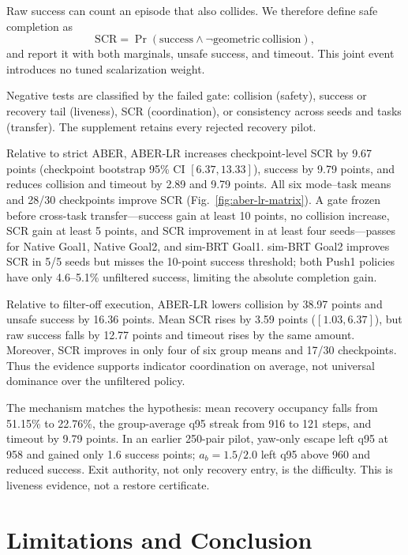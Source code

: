 \documentclass[letterpaper]{article}
\begin{document}
Raw success can count an episode that also collides.  We therefore define
safe completion as
\begin{equation}
 \mathrm{SCR}=\Pr(\mathrm{success}\land
                    \neg\mathrm{geometric\ collision}),       \label{eq:scr}
\end{equation}
and report it with both marginals, unsafe success, and timeout.  This joint
event introduces no tuned scalarization weight.

Negative tests are classified by the failed gate: collision (safety), success
or recovery tail (liveness), SCR (coordination), or consistency across seeds
and tasks (transfer).  The supplement retains every rejected recovery pilot.



Relative to strict ABER, ABER-LR increases checkpoint-level SCR by
9.67 points (checkpoint bootstrap 95\% CI $[6.37,13.33]$), success by
9.79 points, and reduces collision and timeout by 2.89 and 9.79 points.
All six mode--task means and 28/30 checkpoints improve SCR
(Fig.~\ref{fig:aber-lr-matrix}).  A gate frozen before cross-task
transfer---success gain at least 10 points, no collision increase, SCR gain at
least 5 points, and SCR improvement in at least four seeds---passes for Native Goal1, Native Goal2,
and sim-BRT Goal1.  sim-BRT Goal2 improves SCR in 5/5 seeds but misses the
10-point success threshold; both Push1 policies have only 4.6--5.1\%
unfiltered success, limiting the absolute completion gain.

Relative to filter-off execution, ABER-LR lowers collision by 38.97 points
and unsafe success by 16.36 points.  Mean SCR rises by 3.59 points
($[1.03,6.37]$), but raw success falls by 12.77 points and timeout rises by
the same amount.  Moreover, SCR improves in only four of six group means and
17/30 checkpoints.  Thus the evidence supports indicator coordination on
average, not universal dominance over the unfiltered policy.

The mechanism matches the hypothesis: mean recovery occupancy falls from
51.15\% to 22.76\%, the group-average q95 streak from 916 to 121 steps, and
timeout by 9.79 points.  In an earlier 250-pair pilot, yaw-only escape left
q95 at 958 and gained only 1.6 success points; $a_b=1.5/2.0$ left q95 above
960 and reduced success.  Exit authority, not only recovery entry, is the
difficulty.  This is liveness evidence, not a restore certificate.
\section{Limitations and Conclusion}
\end{document}

